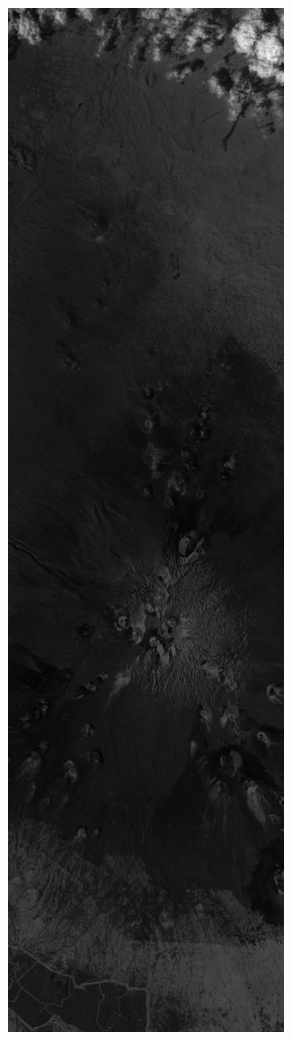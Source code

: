 \begin{figure}[]
\centering
\ContinuedFloat
\begin{subfigure}{0.48\textwidth}
  \centering
  \includegraphics[width=0.8\linewidth]{images/example_compression_Mauna_Kea_0_025.png}

\end{subfigure}
\end{figure}
